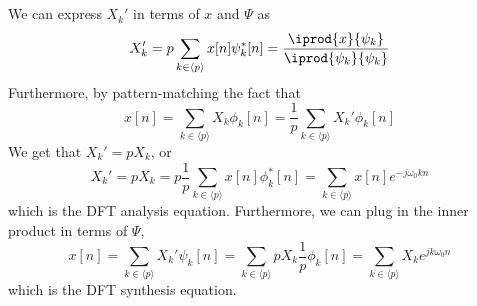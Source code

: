 \documentclass{article}
\begin{document}
\subsection{}

We can express \(X_k'\) in terms of \(x\) and \(\Psi\) as
\begin{equation}
    X_k' = p \sum_{k \in \langle p \rangle} x[n] \psi_k^\ast[n] = \frac{\iprod{x}{\psi_k}}{\iprod{\psi_k}{\psi_k}}
\end{equation}
Furthermore, by pattern-matching the fact that
\begin{equation}
    x[n] = \sum_{k \in \langle p \rangle} X_k \phi_k[n] = \frac{1}{p} \sum_{k \in \langle p \rangle} X_k' \phi_k[n]
\end{equation}
We get that \(X_k' = p X_k\), or
\begin{equation}
    X_k' = p X_k = p \frac{1}{p} \sum_{k \in \langle p \rangle} x[n] \phi_k^\ast[n] = \sum_{k \in \langle p \rangle} x[n] e^{-j \omega_0 k n}
\end{equation}
which is the DFT analysis equation.
Furthermore, we can plug in the inner product in terms of \(\Psi\),
\begin{equation}
    x[n] = \sum_{k \in \langle p \rangle} X_k' \psi_k[n] = \sum_{k \in \langle p \rangle} p X_k \frac{1}{p} \phi_k[n] = \sum_{k \in \langle p \rangle} X_k e^{j k \omega_0 n}
\end{equation}
which is the DFT synthesis equation.
\end{document}
